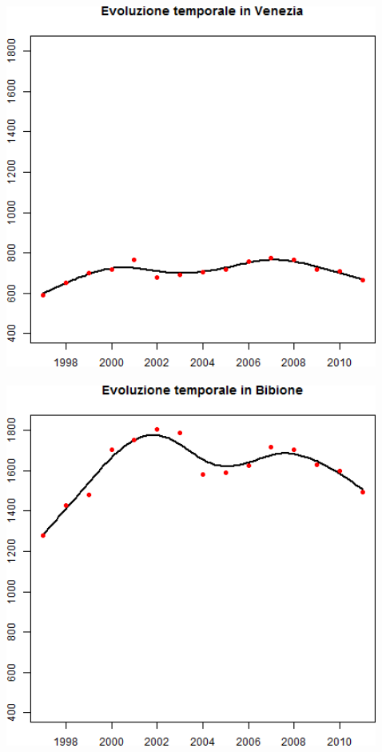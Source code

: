 \documentclass[landscape,9pt]{beamer}                           %
\begin{document}
\begin{frame}
\begin{columns}
\begin{column}{0.225\textwidth}
	\end{column}
	\begin{column}{0.225\textwidth}
	\includegraphics[width=1\textwidth]{Immagini/Venezia/Venezia.png}
	\ \
	\newline
	\includegraphics[width=1\textwidth]{Immagini/Venezia/Bibione.png}
	\end{column}
	\begin{column}{0.35\textwidth}	
		\begin{center}		
		\end{center}
	\end{column}
\end{columns}
\end{frame}
\end{document}
